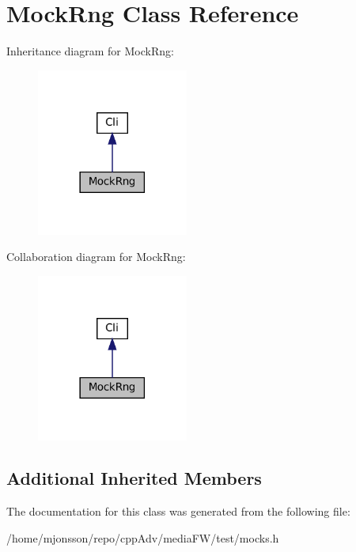 \hypertarget{classMockRng}{}\section{Mock\+Rng Class Reference}
\label{classMockRng}


Inheritance diagram for Mock\+Rng\+:
\nopagebreak
\begin{figure}[H]
\begin{center}
\leavevmode
\includegraphics[width=141pt]{classMockRng__inherit__graph}
\end{center}
\end{figure}


Collaboration diagram for Mock\+Rng\+:
\nopagebreak
\begin{figure}[H]
\begin{center}
\leavevmode
\includegraphics[width=141pt]{classMockRng__coll__graph}
\end{center}
\end{figure}
\subsection*{Additional Inherited Members}


The documentation for this class was generated from the following file\+:\begin{DoxyCompactItemize}
\item 
/home/mjonsson/repo/cpp\+Adv/media\+F\+W/test/mocks.\+h\end{DoxyCompactItemize}
